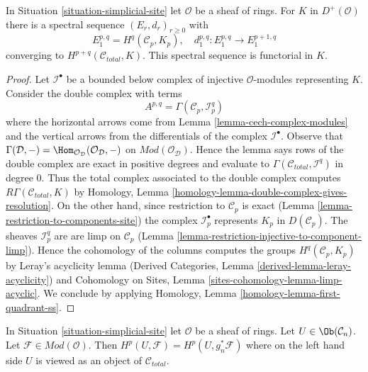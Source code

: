 \begin{lemma}
\label{lemma-simplicial-module-cohomology-site}
In Situation \ref{situation-simplicial-site} let $\mathcal{O}$
be a sheaf of rings. For $K$ in $D^+(\mathcal{O})$
there is a spectral sequence $(E_r, d_r)_{r \geq 0}$ with
$$
E_1^{p, q} = H^q(\mathcal{C}_p, K_p),\quad
d_1^{p, q} : E_1^{p, q} \to E_1^{p + 1, q}
$$
converging to $H^{p + q}(\mathcal{C}_{total}, K)$.
This spectral sequence is functorial in $K$.
\end{lemma}

\begin{proof}
Let $\mathcal{I}^\bullet$ be a bounded below complex of injective
$\mathcal{O}$-modules representing $K$. Consider the double complex with terms
$$
A^{p, q} = \Gamma(\mathcal{C}_p, \mathcal{I}^q_p)
$$
where the horizontal arrows come from
Lemma \ref{lemma-cech-complex-modules}
and the vertical arrows from the differentials of the
complex $\mathcal{I}^\bullet$. Observe that
$\Gamma(\mathcal{D}, -) =
\Hom_{\mathcal{O}_\mathcal{D}}(\mathcal{O}_\mathcal{D}, -)$
on $\textit{Mod}(\mathcal{O}_\mathcal{D})$. Hence the lemma
says rows of the double complex are exact
in positive degrees and evaluate to
$\Gamma(\mathcal{C}_{total}, \mathcal{I}^q)$ in degree $0$.
Thus the total complex associated to the double complex
computes $R\Gamma(\mathcal{C}_{total}, K)$ by
Homology, Lemma \ref{homology-lemma-double-complex-gives-resolution}.
On the other hand, since restriction to $\mathcal{C}_p$ is exact
(Lemma \ref{lemma-restriction-to-components-site})
the complex $\mathcal{I}_p^\bullet$ represents $K_p$ in
$D(\mathcal{C}_p)$. The sheaves $\mathcal{I}_p^q$ are
are limp on $\mathcal{C}_p$
(Lemma \ref{lemma-restriction-injective-to-component-limp}).
Hence the cohomology of the columns computes the groups
$H^q(\mathcal{C}_p, K_p)$ by Leray's acyclicity lemma
(Derived Categories, Lemma \ref{derived-lemma-leray-acyclicity})
and
Cohomology on Sites, Lemma \ref{sites-cohomology-lemma-limp-acyclic}.
We conclude by applying
Homology, Lemma \ref{homology-lemma-first-quadrant-ss}.
\end{proof}

\begin{lemma}
\label{lemma-sanity-check-modules}
In Situation \ref{situation-simplicial-site} let $\mathcal{O}$
be a sheaf of rings. Let $U \in \Ob(\mathcal{C}_n)$. Let
$\mathcal{F} \in \textit{Mod}(\mathcal{O})$.
Then $H^p(U, \mathcal{F}) = H^p(U, g_n^*\mathcal{F})$
where on the left hand side $U$ is viewed as an object of
$\mathcal{C}_{total}$.
\end{lemma}

